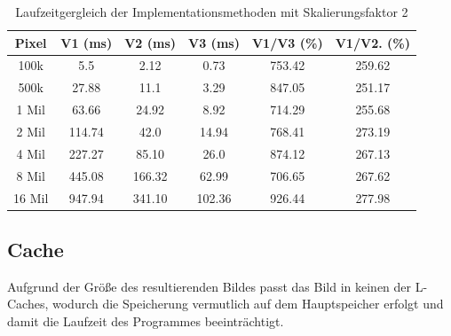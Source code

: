 \documentclass[course=erap]{aspdoc}
\begin{document}
\begin{table}[ht]
\centering
\begin{tabular}{|c|c|c|c|c|c|}
\hline
Pixel & V1 (ms) & V2 (ms) & V3 (ms) & V1/V3 (\%) & V1/V2. (\%) \\ 
\hline
100k & 5.5 & 2.12 & 0.73 & 753.42 & 259.62 \\
500k & 27.88 & 11.1 & 3.29 & 847.05 & 251.17 \\
1 Mil & 63.66 & 24.92 & 8.92 & 714.29 & 255.68 \\
2 Mil & 114.74 & 42.0 & 14.94 & 768.41 & 273.19 \\
4 Mil & 227.27 & 85.10 & 26.0 & 874.12 & 267.13 \\
8 Mil & 445.08 & 166.32 & 62.99 & 706.65 & 267.62 \\
16 Mil & 947.94 & 341.10 & 102.36 & 926.44 & 277.98 \\
\hline
\end{tabular}
\caption{Laufzeitgergleich der Implementationsmethoden mit Skalierungsfaktor 2}
\label{table:comparison2}
\end{table}



\subsection{Cache}
Aufgrund der Größe des resultierenden Bildes passt das Bild in keinen der L-Caches, wodurch die Speicherung vermutlich auf dem Hauptspeicher erfolgt und damit die Laufzeit des Programmes beeinträchtigt.
\end{document}

